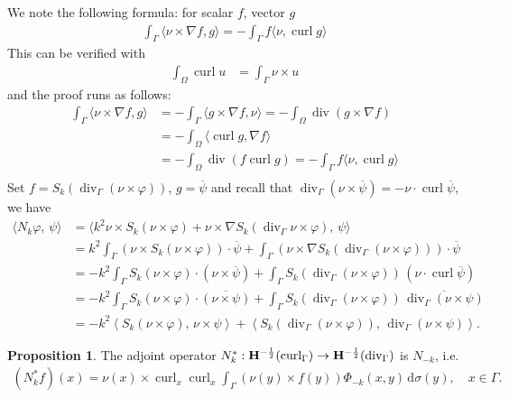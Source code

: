 \documentclass[a4paper,12pt]{article}
\theoremstyle{definition}
\newtheorem{prp}{Proposition}
\newcommand\bdr{\Gamma}
\newcommand\Div{\divv_\bdr}
\newcommand\Curl{\curl_\bdr}
\newcommand\Hhm{{\bf H}^{-\frac{1}{2}}}
\newcommand\lTD{\Hhm(\Div)}
\newcommand\lTC{\Hhm(\Curl)}
\newcommand\intvnn[1]{\int_{\Omega}#1}
\newcommand\ints[2][y]{\int_{\bdr}#2\,\text{d}\sigma(#1)}
\newcommand\intsnn[1]{\int_{\bdr}#1}
\DeclareMathOperator\curl{curl}
\DeclareMathOperator\divv{div}
\begin{document}
We note the following formula: for scalar $f$, vector $g$
\begin{align*}
  \intsnn{\langle\nu\times\nabla f, g\rangle} = -\intsnn{f\langle\nu, \curl g\rangle}
\end{align*}
This can be verified with
\begin{align*}
  \intvnn{\curl u} &= \intsnn{\nu\times u}
\end{align*}
and the proof runs as follows:
\begin{align*}
  \intsnn{\langle\nu\times\nabla f, g\rangle} 
  &= -\intsnn{\langle g\times\nabla f, \nu\rangle} =-\intvnn{\divv(g\times\nabla f)} \\
  &=-\intvnn{\langle\curl g, \nabla f\rangle} \\
  &=-\intvnn{\divv(f\curl g)} =-\intsnn{f\langle\nu,\curl g\rangle} \\
\end{align*}
Set $f=S_k(\Div(\nu\times\varphi))$, $g=\overline{\psi}$ and recall that $\Div(\nu\times\overline{\psi}) = -\nu\cdot\curl\overline{\psi}$, we have 
\begin{align}\label{eq:Nsesqui}
  \langle N_k\varphi,\,\psi\rangle 
  &=\langle k^2\nu\times S_k(\nu\times\varphi) + \nu\times\nabla S_k(\Div\nu\times\varphi),\,\psi\rangle\nonumber\\ 
  &=k^2\intsnn{\left(\nu\times S_k(\nu\times\varphi)\right)\cdot\overline{\psi}}+\intsnn{\left(\nu\times\nabla S_k(\Div(\nu\times\varphi))\right)\cdot\overline{\psi}}\nonumber\\
  &=-k^2\intsnn{S_k(\nu\times\varphi)\cdot\left(\nu\times\overline{\psi}\right)}+\intsnn{S_k(\Div(\nu\times\varphi))\,\left(\nu\cdot\curl\overline{\psi}\right)}\nonumber\\
  &=-k^2\intsnn{S_k(\nu\times\varphi)\cdot\overline{\left(\nu\times\psi\right)}}+\intsnn{S_k(\Div(\nu\times\varphi))\,\overline{\Div\left(\nu\times\psi\right)}}\nonumber\\
  &=-k^2\left\langle S_k(\nu\times\varphi),\,\nu\times\psi\right\rangle + \left\langle S_k(\Div(\nu\times\varphi)),\,\Div(\nu\times\psi)\right\rangle.
\end{align}

\begin{prp}
  The adjoint operator $N_k^*:\lTC\rightarrow\lTD$ is $N_{-k}$, i.e. 
  \begin{align}
    (N_k^*f)(x)=\nu(x)\times\curl_x\curl_x\ints{\left(\nu(y)\times f(y)\right)\Phi_{-k}(x, y)},\quad x\in\bdr.
  \end{align}
\end{prp}
\end{document}
